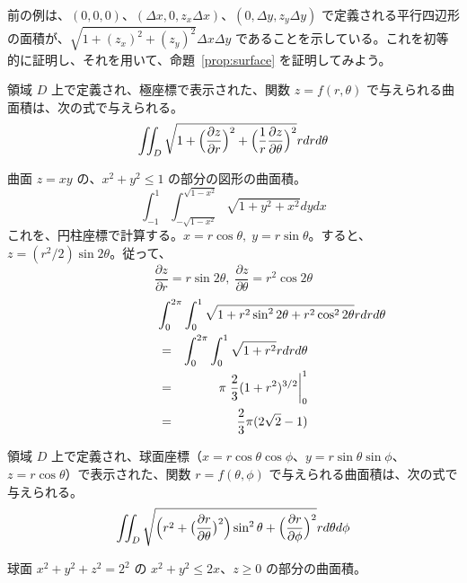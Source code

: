 前の例は、$(0,0,0)$、$(\Delta x,0,z_x\Delta x)$、$(0,\Delta y,z_y\Delta y)$ で定義される平行四辺形の面積が、$\sqrt{1 +(z_x)^2 + (z_y)^2}\Delta x\Delta y$ であることを示している。これを初等的に証明し、それを用いて、命題~\ref{prop:surface} を証明してみよう。

\begin{prop} \label{prop:surface:cylinder}
領域 $D$ 上で定義され、極座標で表示された、関数 $z=f(r,\theta)$ で与えられる曲面積は、次の式で与えられる。
$$\iint_D\sqrt{1+\Bigl(\frac{\partial z}{\partial r}\Bigr)^2 + \Bigl(\frac{1}{r}\frac{\partial z}{\partial \theta}\Bigr)^2}rdrd\theta$$
\end{prop}

\begin{eg}
曲面 $z = xy$ の、$x^2 + y^2 \leq 1$ の部分の図形の曲面積。
$$\int_{-1}^{1}\int_{-\sqrt{1-x^2}}^{\sqrt{1-x^2}}\sqrt{1+y^2+x^2}dydx$$
これを、円柱座標で計算する。$x = r\cos\theta, \;y = r\sin\theta$。すると、$z = (r^2/2)\sin2\theta$。従って、
$$\frac{\partial z}{\partial r} = r\sin2\theta,\;\frac{\partial z}{\partial \theta} = r^2\cos2\theta$$
\begin{eqnarray}
\lefteqn{\int_0^{2\pi}\int_0^1\sqrt{1+r^2\sin^22\theta + r^2\cos^22\theta}rdrd\theta}\\
& = & \int_0^{2\pi}\int_0^1\sqrt{1+r^2}rdrd\theta\\
& = & \pi\left.\frac{2}{3}(1+r^2)^{3/2}\right|_0^1\\
& = & \frac23\pi(2\sqrt{2} - 1)
\end{eqnarray}
\end{eg} 

\begin{prop} \label{prop:surface:sphere}
領域 $D$ 上で定義され、球面座標（$x = r\cos\theta\cos\phi$、$y = r\sin\theta\sin\phi$、$z = r\cos\theta$）で表示された、関数 $r=f(\theta,\phi)$ で与えられる曲面積は、次の式で与えられる。
$$\iint_D\sqrt{\Bigl(r^2 + \bigl(\frac{\partial r}{\partial \theta}\bigr)^2\Bigr)\sin^2\theta + \Bigl(\frac{\partial r}{\partial \phi}\Bigr)^2}rd\theta d\phi$$
\end{prop}

\begin{eg}
球面 $x^2+y^2 + z^2 = 2^2$ の $x^2+y^2\leq 2x$、$z\geq 0$ の部分の曲面積。
\end{eg}


